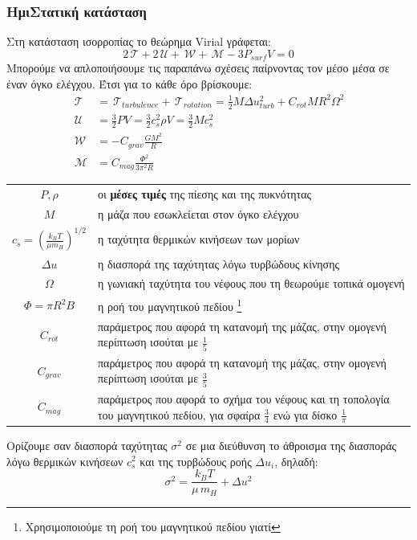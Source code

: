 \documentclass[a4paper,12pt]{memoir}
\newcommand{\TT}{\,\mathcal{T}}
\newcommand{\UU}{\,\mathcal{U}}
\newcommand{\WW}{\,\mathcal{W}}
\newcommand{\MM}{\,\mathcal{M}}
\begin{document}
\subsubsection{ΗμιΣτατική κατάσταση}
Στη κατάσταση ισορροπίας το θεώρημα Virial γράφεται:
\begin{equation}
\label{eq:Virial}
2\TT+2\UU +\WW+\MM -3P_{surf}V=0
\end{equation}
Μπορούμε να απλοποιήσουμε τις παραπάνω σχέσεις παίρνοντας τον μέσο μέσα σε έναν όγκο ελέγχου. Έτσι για το κάθε όρο βρίσκουμε:
\begin{align}
\TT &= \TT_{turbulence}+\TT_{rotation} = \frac{1}{2} M \Delta u_{turb} ^2 + C_{rot} M R^2 \Omega ^2\\
\UU &= \frac{3}{2} P V=\frac{3}{2} c_s ^2 \rho V=\frac{3}{2} M c_s ^2 \\
\WW &= -C_{grav} \frac{GM^2}{R} \\
\MM & = C_{mag}\frac{\Phi^2}{3 \pi ^2 R}
\end{align}
\noindent

\begin{tabular}{|c p{9cm}}
$P,\rho$ &οι \textbf{μέσες τιμές} της πίεσης και της πυκνότητας \\
$M$ &η μάζα που εσωκλείεται στον όγκο ελέγχου\\
$c_s =\left( \frac{k_B T}{\mu m_H}\right) ^{1/2}$ &η ταχύτητα θερμικών κινήσεων των μορίων \\
$\Delta u$ &η διασπορά της ταχύτητας λόγω τυρβώδους κίνησης \\
$\Omega$ &η γωνιακή ταχύτητα του νέφους που τη θεωρούμε τοπικά ομογενή \\
$\Phi=\pi R^2 B$ &η ροή του μαγνητικού πεδίου \footnote{Χρησιμοποιούμε τη ροή του μαγνητικού πεδίου γιατί } \\
$C_{rot}$ &παράμετρος που αφορά τη κατανομή της μάζας, στην ομογενή περίπτωση ισούται με $\frac{1}{5}$ \\
$C_{grav}$ &παράμετρος που αφορά τη κατανομή της μάζας, στην ομογενή περίπτωση ισούται με $\frac{3}{5}$ \\
$C_{mag}$ &παράμετρος που αφορά το σχήμα του νέφους και τη τοπολογία του μαγνητικού πεδίου, για σφαίρα $\frac{3}{4}$ ενώ για δίσκο $\frac{1}{\pi}$
\end{tabular}

\medskip

Ορίζουμε σαν διασπορά ταχύτητας $\sigma ^2$ σε μια διεύθυνση το άθροισμα της διασποράς λόγω θερμικών κινήσεων $c_s ^2 $ και της τυρβώδους ροής $\Delta u _i $, δηλαδή:
\begin{equation}
\label{eq:dispersion}
\sigma ^2=\frac{k_B T}{\mu \, m_H}+ \Delta u^2
\end{equation} 
\end{document}
